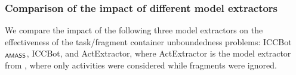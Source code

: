



\subsubsection{Comparison of the impact of different model extractors}\label{sec:cmp}
%
We compare the impact of the following three model extractors on the effectiveness of the task/fragment container unboundedness problems: ICCBot$_{\textsf{AMASS}}$, ICCBot, and ActExtractor, where ActExtractor is the model extractor from  \cite{HCWWY19}, where only activities were considered while fragments were ignored. 


